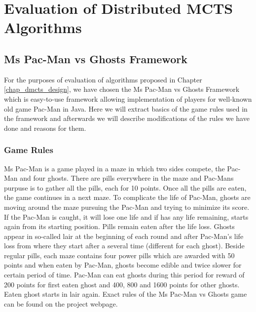 \chapter{Evaluation of Distributed MCTS Algorithms}
\label{chap_evaluation}

\section{Ms Pac-Man vs Ghosts Framework}
\label{sec_pacman_vs_ghosts}

For the purposes of evaluation of algorithms proposed in Chapter \ref{chap_dmcts_design}, we
have chosen the Ms Pac-Man vs Ghosts Framework \cite{PacmanVsGhosts} which is easy-to-use
framework allowing implementation of players for well-known old game Pac-Man in Java. Here we
will extract basics of the game rules used in the framework and afterwards we will
describe modifications of the rules we have done and reasons for them.

\subsection{Game Rules}

Ms Pac-Man is a game played in a maze in which two sides compete, the Pac-Man and four ghosts.
There are pills everywhere in the maze and Pac-Mans purpuse is to gather all the pills, each
for 10 points. Once all the pills are eaten, the game continues in a next maze. To complicate
the life of Pac-Man, ghosts are moving around the maze pursuing the Pac-Man and trying to
minimize its score. If the Pac-Man is caught, it will lose one life and if has any life
remaining, starts again from its starting position. Pills remain eaten after the life loss.
Ghosts appear in so-called lair at the beginning of each round and after Pac-Man's life loss
from where they start after a several time (different for each ghost). Beside regular pills,
each maze contains four power pills which are awarded with 50 points and when eaten by Pac-Man,
ghosts become edible and twice slower for certain period of time. Pac-Man can eat ghosts during 
this period for
reward of 200 points for first eaten ghost and 400, 800 and 1600 points for other ghosts.
Eaten ghost starts in lair again. Exact rules of the Ms Pac-Man vs Ghosts game can be found on the project webpage. 

